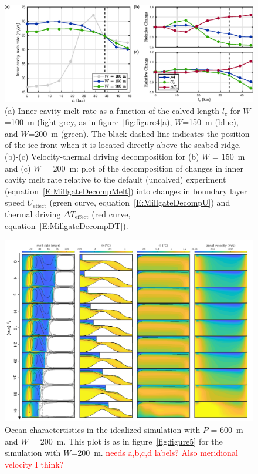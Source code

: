 \documentclass[draft]{agujournal2019}
\newcommand{\red}[1]{\textcolor{red}{#1}}
\begin{document}
\begin{figure}
    \centering
    \includegraphics[width = \textwidth]{../make_figures/plots/figure6.eps}
    \caption{(a) Inner cavity melt rate as a function of the calved length $l_c$ for $W$=100~m (light grey, as in figure~\ref{fig:figure4}a), $W$=150~m (blue), and $W$=200~m (green). The black dashed line indicates the position of the ice front when it is located directly above the seabed ridge. (b)-(c) Velocity-thermal driving decomposition for (b) $W$ = 150~m and (c) $W$ = 200~m: plot of the decomposition of changes in inner cavity melt rate relative to the default (uncalved) experiment (equation~\eqref{E:MillgateDecompMelt}) into changes in boundary layer speed $U_\text{effect}$ (green curve, equation~\eqref{E:MillgateDecompU}) and thermal driving $\Delta T_{\text{effect}}$ (red curve, equation~\eqref{E:MillgateDecompDT}).}
    \label{fig:figure6}
\end{figure}

\begin{figure}
    \centering
    \includegraphics[width = \textwidth]{../make_figures/plots/figure7_axislabel.pdf}
    \caption{Ocean charactertistics in the idealized simulation with $P$ = 600~m and $W$ = 200~m. This plot is as in figure~\ref{fig:figure5} for the simulation with $W$=200~m. \red{needs a,b,c,d labels? Also meridional velocity I think?}}
    \label{fig:figure7}
\end{figure}
\end{document}
